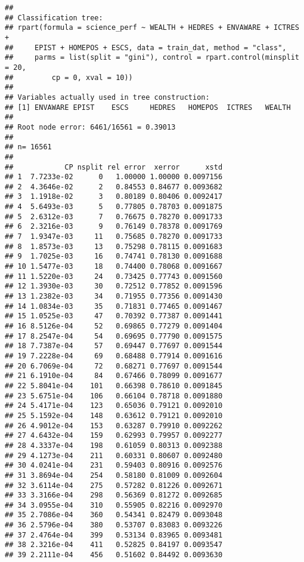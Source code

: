 \documentclass[]{book}
\begin{document}
\begin{verbatim}
## 
## Classification tree:
## rpart(formula = science_perf ~ WEALTH + HEDRES + ENVAWARE + ICTRES + 
##     EPIST + HOMEPOS + ESCS, data = train_dat, method = "class", 
##     parms = list(split = "gini"), control = rpart.control(minsplit = 20, 
##         cp = 0, xval = 10))
## 
## Variables actually used in tree construction:
## [1] ENVAWARE EPIST    ESCS     HEDRES   HOMEPOS  ICTRES   WEALTH  
## 
## Root node error: 6461/16561 = 0.39013
## 
## n= 16561 
## 
##            CP nsplit rel error  xerror      xstd
## 1  7.7233e-02      0   1.00000 1.00000 0.0097156
## 2  4.3646e-02      2   0.84553 0.84677 0.0093682
## 3  1.1918e-02      3   0.80189 0.80406 0.0092417
## 4  5.6493e-03      5   0.77805 0.78703 0.0091875
## 5  2.6312e-03      7   0.76675 0.78270 0.0091733
## 6  2.3216e-03      9   0.76149 0.78378 0.0091769
## 7  1.9347e-03     11   0.75685 0.78270 0.0091733
## 8  1.8573e-03     13   0.75298 0.78115 0.0091683
## 9  1.7025e-03     16   0.74741 0.78130 0.0091688
## 10 1.5477e-03     18   0.74400 0.78068 0.0091667
## 11 1.5220e-03     24   0.73425 0.77743 0.0091560
## 12 1.3930e-03     30   0.72512 0.77852 0.0091596
## 13 1.2382e-03     34   0.71955 0.77356 0.0091430
## 14 1.0834e-03     35   0.71831 0.77465 0.0091467
## 15 1.0525e-03     47   0.70392 0.77387 0.0091441
## 16 8.5126e-04     52   0.69865 0.77279 0.0091404
## 17 8.2547e-04     54   0.69695 0.77790 0.0091575
## 18 7.7387e-04     57   0.69447 0.77697 0.0091544
## 19 7.2228e-04     69   0.68488 0.77914 0.0091616
## 20 6.7069e-04     72   0.68271 0.77697 0.0091544
## 21 6.1910e-04     84   0.67466 0.78099 0.0091677
## 22 5.8041e-04    101   0.66398 0.78610 0.0091845
## 23 5.6751e-04    106   0.66104 0.78718 0.0091880
## 24 5.4171e-04    123   0.65036 0.79121 0.0092010
## 25 5.1592e-04    148   0.63612 0.79121 0.0092010
## 26 4.9012e-04    153   0.63287 0.79910 0.0092262
## 27 4.6432e-04    159   0.62993 0.79957 0.0092277
## 28 4.3337e-04    198   0.61059 0.80313 0.0092388
## 29 4.1273e-04    211   0.60331 0.80607 0.0092480
## 30 4.0241e-04    231   0.59403 0.80916 0.0092576
## 31 3.8694e-04    254   0.58180 0.81009 0.0092604
## 32 3.6114e-04    275   0.57282 0.81226 0.0092671
## 33 3.3166e-04    298   0.56369 0.81272 0.0092685
## 34 3.0955e-04    310   0.55905 0.82216 0.0092970
## 35 2.7086e-04    360   0.54341 0.82479 0.0093048
## 36 2.5796e-04    380   0.53707 0.83083 0.0093226
## 37 2.4764e-04    399   0.53134 0.83965 0.0093481
## 38 2.3216e-04    411   0.52825 0.84197 0.0093547
## 39 2.2111e-04    456   0.51602 0.84492 0.0093630

\end{verbatim}
\end{document}
